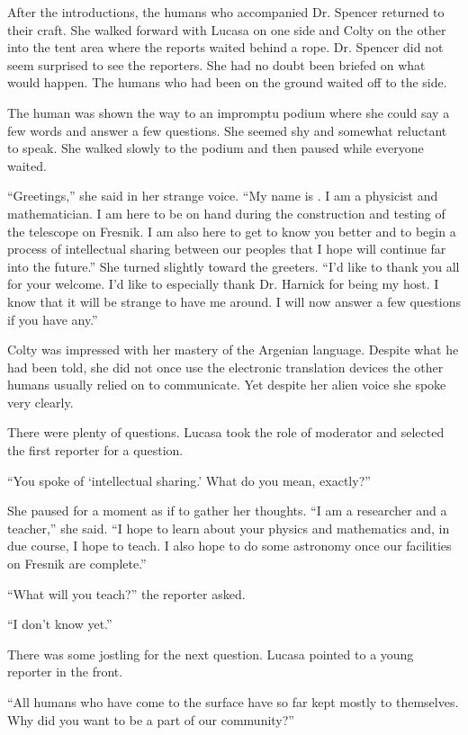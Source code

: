 
After the introductions, the humans who accompanied Dr. Spencer returned to their craft. She
walked forward with Lucasa on one side and Colty on the other into the tent area where the
reports waited behind a rope. Dr. Spencer did not seem surprised to see the reporters. She had
no doubt been briefed on what would happen. The humans who had been on the ground waited off to
the side.

The human was shown the way to an impromptu podium where she could say a few words and answer a
few questions. She seemed shy and somewhat reluctant to speak. She walked slowly to the podium
and then paused while everyone waited.

``Greetings,'' she said in her strange voice. ``My name is . I am a
physicist and mathematician. I am here to be on hand during the construction and testing of the
telescope on Fresnik. I am also here to get to know you better and to begin a process of
intellectual sharing between our peoples that I hope will continue far into the future.'' She
turned slightly toward the greeters. ``I'd like to thank you all for your welcome. I'd like to
especially thank Dr. Harnick for being my host. I know that it will be strange to have me
around. I will now answer a few questions if you have any.''

Colty was impressed with her mastery of the Argenian language. Despite what he had been told,
she did not once use the electronic translation devices the other humans usually relied on to
communicate. Yet despite her alien voice she spoke very clearly.

There were plenty of questions. Lucasa took the role of moderator and selected the first
reporter for a question.

``You spoke of `intellectual sharing.' What do you mean, exactly?''

She paused for a moment as if to gather her thoughts. ``I am a researcher and a teacher,'' she
said. ``I hope to learn about your physics and mathematics and, in due course, I hope to teach.
I also hope to do some astronomy once our facilities on Fresnik are complete.''

``What will you teach?'' the reporter asked.

``I don't know yet.''

There was some jostling for the next question. Lucasa pointed to a young reporter in the
front.

``All humans who have come to the surface have so far kept mostly to themselves. Why did you
want to be a part of our community?''

